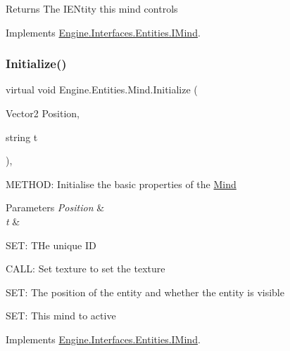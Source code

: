 \begin{DoxyReturn}{Returns}
The I\+E\+Ntity this mind controls
\end{DoxyReturn}


Implements \hyperlink{a00446_af7c7cac5148930a12a85ec64412ac6f2}{Engine.\+Interfaces.\+Entities.\+I\+Mind}.

\mbox{\label{a00318_a386406a6250e4f7e59d0a048545ecc46}} 
\subsubsection{\texorpdfstring{Initialize()}{Initialize()}\hspace{0.1cm}{\footnotesize\ttfamily [1/2]}}
{\footnotesize\ttfamily virtual void Engine.\+Entities.\+Mind.\+Initialize (\begin{DoxyParamCaption}\item[{Vector2}]{Position,  }\item[{string}]{t }\end{DoxyParamCaption})\hspace{0.3cm}{\ttfamily [inline]}, {\ttfamily [virtual]}}



M\+E\+T\+H\+OD\+: Initialise the basic properties of the \hyperlink{a00318}{Mind} 


\begin{DoxyParams}{Parameters}
{\em Position} & \\
\hline
{\em t} & \\
\hline
\end{DoxyParams}
S\+ET\+: T\+He unique ID

C\+A\+LL\+: Set texture to set the texture

S\+ET\+: The position of the entity and whether the entity is visible

S\+ET\+: This mind to active 

Implements \hyperlink{a00446_a6f51a819769ba43f5f1702563293aacd}{Engine.\+Interfaces.\+Entities.\+I\+Mind}.

\mbox{\label{a00318_a353d7d2bb1035aefebf0ae3e3f1d1488}} 
